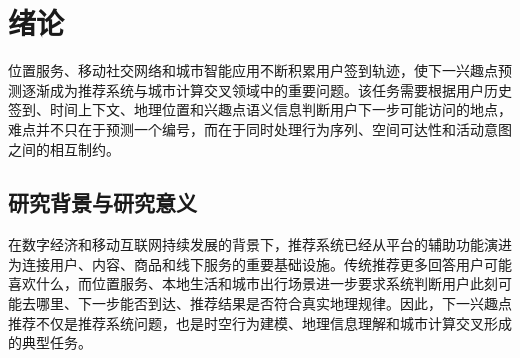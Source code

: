 \chapter{绪论}
\label{chap:intro}

位置服务、移动社交网络和城市智能应用不断积累用户签到轨迹，使下一兴趣点预测逐渐成为推荐系统与城市计算交叉领域中的重要问题。该任务需要根据用户历史签到、时间上下文、地理位置和兴趣点语义信息判断用户下一步可能访问的地点，难点并不只在于预测一个编号，而在于同时处理行为序列、空间可达性和活动意图之间的相互制约。

\section{研究背景与研究意义}
在数字经济和移动互联网持续发展的背景下，推荐系统已经从平台的辅助功能演进为连接用户、内容、商品和线下服务的重要基础设施\cite{koren2009matrix,rendle2009bpr,he2017ncf,zhang2023sequentialsurvey,liu2024cn1}。传统推荐更多回答用户可能喜欢什么，而位置服务、本地生活和城市出行场景进一步要求系统判断用户此刻可能去哪里、下一步能否到达、推荐结果是否符合真实地理规律\cite{gao2022spatiotemporalsurvey,zhao2022cn5,he2021cn6,liu2023cn13,zheng2024cn14}。因此，下一兴趣点推荐不仅是推荐系统问题，也是时空行为建模、地理信息理解和城市计算交叉形成的典型任务。

